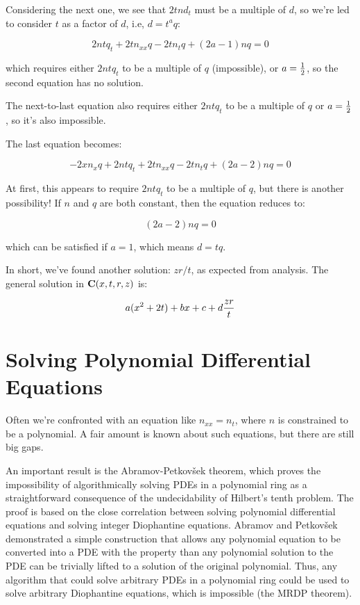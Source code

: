 \documentclass{article}
\newcommand{\C}{\ensuremath{{\bf C}}}
\begin{document}
Considering the next one, we see that $2tnd_t$ must be a multiple of $d$, so we're led to
consider $t$ as a factor of $d$, i.e, $d=t^a q$:

$$2nt q_t + 2tn_{xx}q -2tn_tq +(2a-1)nq = 0$$

which requires either $2ntq_t$ to be a multiple of $q$ (impossible), or $a={1\over2}$,
so the second equation has no solution.

The next-to-last equation also requires either $2ntq_t$ to be a multiple of $q$ or $a={1\over2}$, so it's also impossible.

The last equation becomes:


$$-2xn_xq  + 2 n t q_t +2tn_{xx}q -2tn_tq +(2a-2)nq = 0$$

At first, this appears to require $2ntq_t$ to be a multiple of $q$, but there is another possibility!
If $n$ and $q$ are both constant, then the equation reduces to:

$$(2a-2)nq = 0$$

which can be satisfied if $a=1$, which means $d=tq$.

In short, we've found another solution: $zr/t$, as expected from analysis.
The general solution in $\C(x,t,r,z)$ is:

$$a(x^2+2t)+bx+c+d{zr\over t}$$


\vfill\eject

\section*{Solving Polynomial Differential Equations}

Often we're confronted with an equation like $n_{xx} = n_t$, where $n$
is constrained to be a polynomial.  A fair amount is known about
such equations, but there are still big gaps.

An important result is the Abramov-Petkov\v sek theorem, which proves
the impossibility of algorithmically solving PDEs in a polynomial ring
as a straightforward consequence of the undecidability of Hilbert's
tenth problem.  The proof is based on the close correlation between
solving polynomial differential equations and solving integer Diophantine
equations.  Abramov and Petkov\v sek demonstrated a simple
construction that allows any polynomial equation to be converted
into a PDE with the property than any polynomial solution to the PDE
can be trivially lifted to a solution of the original polynomial.
Thus, any algorithm that could solve arbitrary PDEs in a polynomial
ring could be used to solve arbitrary Diophantine equations, which
is impossible (the MRDP theorem).
\end{document}

